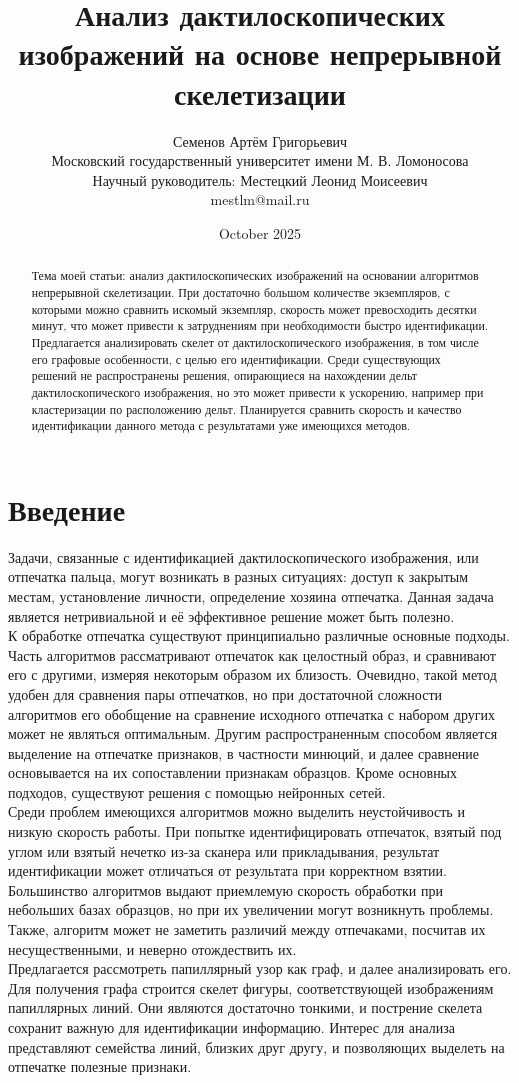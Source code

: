 \documentclass{article}
\title{Анализ дактилоскопических изображений на основе непрерывной скелетизации}
\author{ Семенов Артём Григорьевич\\
	Московский государственный университет имени М. В. Ломоносова \\
        Научный руководитель: Местецкий Леонид Моисеевич \\ 
        mestlm@mail.ru}
\date{October 2025}
\begin{document}
\maketitle
\begin{abstract}
    Тема моей статьи: анализ дактилоскопических изображений на основании алгоритмов непрерывной скелетизации. При достаточно большом количестве экземпляров, с которыми можно сравнить искомый экземпляр, скорость может превосходить десятки минут, что может привести к затруднениям при необходимости быстро идентификации. Предлагается анализировать скелет от дактилоскопического изображения, в том числе его графовые особенности, с целью его идентификации. Среди существующих решений не распространены решения, опирающиеся на нахождении дельт дактилоскопического изображения, но это может привести к ускорению, например при кластеризации по расположению дельт. Планируется сравнить скорость и качество идентификации данного метода с результатами уже имеющихся методов.
\end{abstract}
\section{Введение}
Задачи, связанные с идентификацией дактилоскопического изображения, или отпечатка пальца, могут возникать в разных ситуациях: доступ к закрытым местам, установление личности, определение хозяина отпечатка. Данная задача является нетривиальной и её эффективное решение может быть полезно. \\
К обработке отпечатка существуют принципиально различные основные подходы. Часть алгоритмов рассматривают отпечаток как целостный образ, и сравнивают его с другими, измеряя некоторым образом их близость. Очевидно, такой метод удобен для сравнения пары отпечатков, но при достаточной сложности алгоритмов его обобщение на сравнение исходного отпечатка с набором других может не являться оптимальным. Другим распространенным способом является выделение на отпечатке признаков, в частности минюций, и далее сравнение основывается на их сопоставлении признакам образцов. Кроме основных подходов, существуют решения с помощью нейронных сетей. \\
Среди проблем имеющихся алгоритмов можно выделить неустойчивость и низкую скорость работы. При попытке идентифицировать отпечаток, взятый под углом или взятый нечетко из-за сканера или прикладывания, результат идентификации может отличаться от результата при корректном взятии. Большинство алгоритмов выдают приемлемую скорость обработки при небольших базах образцов, но при их увеличении могут возникнуть проблемы. Также, алгоритм может не заметить различий между отпечаками, посчитав их несущественными, и неверно отождествить их. \\
Предлагается рассмотреть папиллярный узор как граф, и далее анализировать его. Для получения графа строится скелет фигуры, соответствующей изображениям папиллярных линий. Они являются достаточно тонкими, и пострение скелета сохранит важную для идентификации информацию. Интерес для анализа представляют семейства линий, близких друг другу, и позволяющих выделеть на отпечатке полезные признаки.
\end{document}
